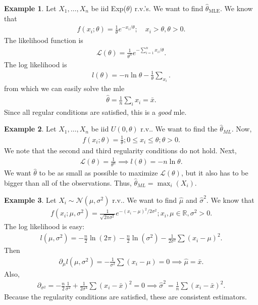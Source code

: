 \documentclass{book}
\theoremstyle{definition}
\newtheorem{exmp}{Example}[section]
\newcommand{\p}{\partial}
\newcommand{\lag}{\mathcal{L}}
\newcommand{\N}{\mathcal{N}}
\newcommand{\f}[2]{\frac{#1}{#2}}
\begin{document}
\begin{exmp}
	Let $X_1,\dots,X_n$ be iid Exp($\theta$) r.v.'s. We want to find $\hat\theta_{\text{MLE}}$. We know that
	\begin{align}
	f(x_i;\theta) = \f{1}{\theta}e^{-x_i/\theta}; \quad x_i > \theta, \theta > 0.
	\end{align}
	The likelihood function is
	\begin{align}
	\lag(\theta) = \f{1}{\theta^n}e^{-\sum^n_{i=1}x_i/\theta}.
	\end{align}
	The log likelihood is
	\begin{align}
	l(\theta) = -n\ln \theta - \f{1}{\theta} \sum_{x_i}.
	\end{align}
	from which we can easily solve the mle
	\begin{align}
	\hat\theta = \f{1}{n}\sum_i x_i = \bar{x}.
	\end{align}
	Since all regular conditions are satisfied, this is a \textit{good} mle.
	
	
	
\end{exmp}



\begin{exmp}
	Let $X_1,\dots,X_n$ be iid $U(0,\theta)$ r.v.. We want to find the $\hat{\theta}_{ML}$. Now,
	\begin{align}
	f(x_i;\theta) = \f{1}{\theta}; 0 \leq x_i \leq \theta; \theta > 0.
	\end{align} 
	We note that the second and third regularity conditions do not hold. Next,
	\begin{align}
	\lag(\theta) = \f{1}{\theta^n} \implies l(\theta) = -n\ln\theta.
	\end{align} 
	We want $\hat\theta$ to be as small as possible to maximize $\lag(\theta)$, but it also has to be bigger than all of the observations. Thus, $\hat\theta_{ML} = \max_i(X_i)$.
\end{exmp}


\begin{exmp}
	Let $X_i \sim \N(\mu,\sigma^2)$ r.v.. We want to find $\hat\mu$ and $\hat\sigma^2$. We know that
	\begin{align}
	f(x_i; \mu,\sigma^2) = \f{1}{\sqrt{2\pi \sigma^2}} e^{-(x_i - \mu)^2/2\sigma^2}; x_i,\mu \in \mathbb{R}, \sigma^2 > 0.
	\end{align} 
	The log likelihood is easy: 
	\begin{align}
	l(\mu,\sigma^2) = -\f{n}{2}\ln(2\pi) - \f{n}{2}\ln(\sigma^2) - \f{1}{2\sigma^2}\sum (x_i - \mu)^2.
	\end{align}
	Then 
	\begin{align}
	\p_\mu l(\mu,\sigma^2) = -\f{1}{\sigma^2}\sum (x_i - \mu) = 0 \implies \hat\mu = \bar{x}.
	\end{align}
	Also,
	\begin{align}
	\p_{\sigma^2} = -\f{n}{2}\f{1}{\sigma^2} + \f{1}{2\sigma^4}\sum (x_i - \bar{x})^2 = 0 \implies \hat\sigma^2 = \f{1}{n}\sum (x_i - \bar{x})^2.
	\end{align}
	Because the regularity conditions are satisfied, these are consistent estimators. 
\end{exmp}
\end{document}
